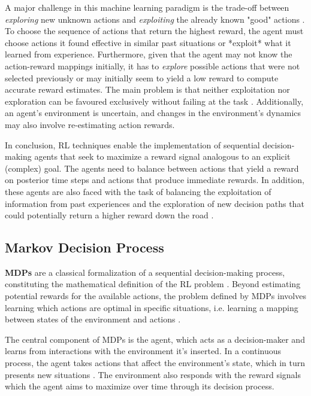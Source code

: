 A major challenge in this machine learning paradigm is the trade-off between \textit{exploring} new unknown actions and \textit{exploiting} the already known "good" actions \cite{suttonReinforcementLearningIntroduction2014}. To choose the sequence of actions that return the highest reward, the agent must choose actions it found effective in similar past situations or *exploit* what it learned from experience. Furthermore, given that the agent may not know the action-reward mappings initially, it has to \textit{explore} possible actions that were not selected previously or may initially seem to yield a low reward to compute accurate reward estimates. The main problem is that neither exploitation nor exploration can be favoured exclusively without failing at the task \cite{suttonReinforcementLearningIntroduction2014}. Additionally, an agent's environment is uncertain, and changes in the environment's dynamics may also involve re-estimating action rewards. \par


In conclusion, \ac{RL} techniques enable the implementation of sequential decision-making agents that seek to maximize a reward signal analogous to an explicit (complex) goal. The agents need to balance between actions that yield a reward on posterior time steps and actions that produce immediate rewards. In addition, these agents are also faced with the task of balancing the exploitation of information from past experiences and the exploration of new decision paths that could potentially return a higher reward down the road \cite{suttonReinforcementLearningIntroduction2014}.  \par



\subsection{Markov Decision Process} \label{sec:back-mpd}
\textbf{\acfp{MDP}} are a classical formalization of a sequential decision-making process, constituting the mathematical definition of the \ac{RL} problem \cite{suttonReinforcementLearningIntroduction2014, moralesGrokkingDeepReinforcement2020}. Beyond estimating potential rewards for the available actions, the problem defined by \acp{MDP} involves learning which actions are optimal in specific situations, i.e. learning a mapping between states of the environment and actions \cite{suttonReinforcementLearningIntroduction2014}. 

The central component of \acp{MDP} is the agent, which acts as a decision-maker and learns from interactions with the environment it's inserted. In a continuous process, the agent takes actions that affect the environment's state, which in turn presents new situations \cite{suttonReinforcementLearningIntroduction2014}. The environment also responds with the reward signals which the agent aims to maximize over time through its decision process.

